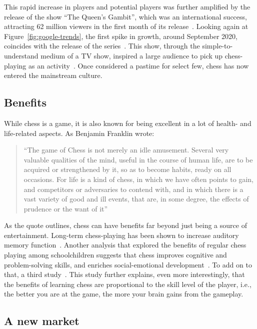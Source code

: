 This rapid increase in players and potential players was further amplified by the release of the show ``The Queen's
Gambit'', which was an international success, attracting 62 million viewers in the first month of its
release~\cite{deadline2020}.
Looking again at Figure~\ref{fig:google-trends}, the first spike in growth, around September 2020, coincides with the
release of the series~\cite{nyt2022}.
This show, through the simple-to-understand medium of a TV show, inspired a large audience to pick up chess-playing as
an activity~\cite{polygon2023}.
Once considered a pastime for select few, chess has now entered the mainstream culture.

\subsection{Benefits}\label{subsec:benefits}

While chess is a game, it is also known for being excellent in a lot of health- and life-related aspects.
As Benjamin Franklin wrote:~\blockcquote{franklin1786}{``The game of Chess is not merely an idle amusement. Several very
valuable qualities of the mind, useful in the course of human life, are to be acquired or strengthened by it, so as to
become habits, ready on all occasions. For life is a kind of chess, in which we have often points to gain, and
competitors or adversaries to contend with, and in which there is a vast variety of good and ill events, that are, in
some degree, the effects of prudence or the want of it''}.

As the quote outlines, chess can have benefits far beyond just being a source of entertainment.
Long-term chess-playing has been shown to increase auditory memory function~\cite{fattahi2015}.
Another analysis that explored the benefits of regular chess playing among schoolchildren suggests that chess improves
cognitive and problem-solving skills, and enriches social-emotional development~\cite{aciego2012}.
To add on to that, a third study~.
This study further explains, even more interestingly, that the benefits of learning chess are proportional to the skill
level of the player, i.e., the better you are at the game, the more your brain gains from the gameplay.

\subsection{A new market}\label{subsec:a-new-market}

